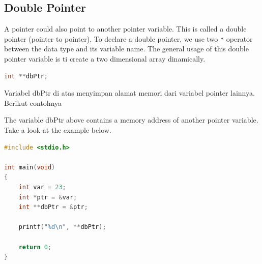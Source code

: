 \subsection{Double Pointer}
A pointer could also point to another pointer variable. This is called a double pointer (pointer to pointer).
To declare a double pointer, we use two \verb|*| operator between the data type and its variable name.
The general usage of this double pointer variable is ti create a two dimensional array dinamically.
\begin{lstlisting}[language=c]
    int **dbPtr;
\end{lstlisting}
Variabel dbPtr di atas menyimpan alamat memori dari variabel pointer lainnya. \\
Berikut contohnya

The variable dbPtr above contains a memory address of another pointer variable.\\
Take a look at the example below.
\begin{lstlisting}[language=c,  caption={Double Pointer Example}]
#include <stdio.h>

int main(void)
{
    int var = 23;
    int *ptr = &var;
    int **dbPtr = &ptr;

    printf("%d\n", **dbPtr);
        
    return 0;
}
\end{lstlisting}

